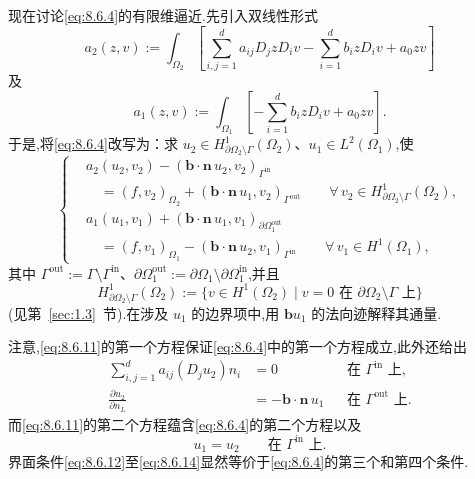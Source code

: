 现在讨论\eqref{eq:8.6.4}的有限维逼近.先引入双线性形式
\begin{equation}\label{eq:8.6.9}
  a_2(z,v):=\int_{\Omega_2}
    \left[\sum_{i,j=1}^d a_{ij}D_jzD_iv-\sum_{i=1}^d b_izD_iv+a_0zv\right]
\end{equation}
及
\begin{equation}\label{eq:8.6.10}
  a_1(z,v):=\int_{\Omega_1}\left[-\sum_{i=1}^d b_izD_iv+a_0zv\right].
\end{equation}
于是,将\eqref{eq:8.6.4}改写为：求 \(u_2\in H^1_{\partial\Omega_2\setminus\Gamma}(\Omega_2)\)、\(u_1\in L^2(\Omega_1)\),使
\begin{equation}\label{eq:8.6.11}
  \left\{
  \begin{aligned}
    &a_2(u_2,v_2)-(\boldsymbol{b}\cdot\boldsymbol{n}\,u_2,v_2)_{\Gamma^{\mathrm{in}}}\\
    &\quad=(f,v_2)_{\Omega_2}+(\boldsymbol{b}\cdot\boldsymbol{n}\,u_1,v_2)_{\Gamma^{\mathrm{out}}}
         \qquad\forall\,v_2\in H^1_{\partial\Omega_2\setminus\Gamma}(\Omega_2),\\
    &a_1(u_1,v_1)+(\boldsymbol{b}\cdot\boldsymbol{n}\,u_1,v_1)_{\partial\Omega_1^{\mathrm{out}}}\\
    &\quad=(f,v_1)_{\Omega_1}-(\boldsymbol{b}\cdot\boldsymbol{n}\,u_2,v_1)_{\Gamma^{\mathrm{in}}}
          \qquad\forall\,v_1\in H^1(\Omega_1),
  \end{aligned}
  \right.
\end{equation}
其中 \(\Gamma^{\mathrm{out}}:=\Gamma\setminus\Gamma^{\mathrm{in}}\)、\(\partial\Omega_1^{\mathrm{out}}:=\partial\Omega_1\setminus\partial\Omega_1^{\mathrm{in}}\),并且
\[
  H^1_{\partial\Omega_2\setminus\Gamma}(\Omega_2)
      :=\{v\in H^1(\Omega_2)\mid v=0\text{ 在 }\partial\Omega_2\setminus\Gamma\text{ 上}\}
\]
(见第~\ref{sec:1.3}~节).在涉及 \(u_1\) 的边界项中,用 \(\boldsymbol{b}u_1\) 的法向迹解释其通量.

注意,\eqref{eq:8.6.11}的第一个方程保证\eqref{eq:8.6.4}中的第一个方程成立,此外还给出
\begin{align}
  \sum_{i,j=1}^d a_{ij}(D_ju_2)n_i&=0
    &&\text{在 }\Gamma^{\mathrm{in}}\text{ 上},\label{eq:8.6.12}\\
  \frac{\partial u_2}{\partial n_L}&=-\boldsymbol{b}\cdot\boldsymbol{n}\,u_1
    &&\text{在 }\Gamma^{\mathrm{out}}\text{ 上}.\label{eq:8.6.13}
\end{align}
而\eqref{eq:8.6.11}的第二个方程蕴含\eqref{eq:8.6.4}的第二个方程以及
\begin{equation}\label{eq:8.6.14}
  u_1=u_2\qquad\text{在 }\Gamma^{\mathrm{in}}\text{ 上}.
\end{equation}
界面条件\eqref{eq:8.6.12}至\eqref{eq:8.6.14}显然等价于\eqref{eq:8.6.4}的第三个和第四个条件.


